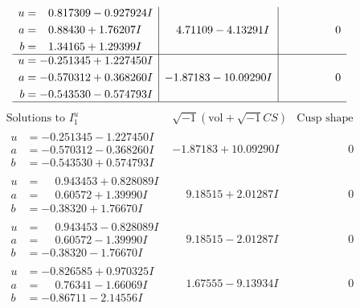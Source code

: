 \documentclass[1p]{elsarticle_modified}
\theoremstyle{definition}
\newcommand{\I}{\sqrt{-1}}
\begin{document}
$$\begin{array}{c|c|c}
\begin{aligned}
u &= \phantom{-}0.817309 - 0.927924 I \\
a &= \phantom{-}0.88430 + 1.76207 I \\
b &= \phantom{-}1.34165 + 1.29399 I\end{aligned}
 & \phantom{-}4.71109 - 4.13291 I & \phantom{-0.000000 } 0 \\ \hline\begin{aligned}
u &= -0.251345 + 1.227450 I \\
a &= -0.570312 + 0.368260 I \\
b &= -0.543530 - 0.574793 I\end{aligned}
 & -1.87183 - 10.09290 I & \phantom{-0.000000 } 0\\
 \hline 
 \end{array}$$\newpage$$\begin{array}{c|c|c}  
\text{Solutions to }I^u_{1}& \I (\text{vol} + \sqrt{-1}CS) & \text{Cusp shape}\\
 \hline 
\begin{aligned}
u &= -0.251345 - 1.227450 I \\
a &= -0.570312 - 0.368260 I \\
b &= -0.543530 + 0.574793 I\end{aligned}
 & -1.87183 + 10.09290 I & \phantom{-0.000000 } 0 \\ \hline\begin{aligned}
u &= \phantom{-}0.943453 + 0.828089 I \\
a &= \phantom{-}0.60572 + 1.39990 I \\
b &= -0.38320 + 1.76670 I\end{aligned}
 & \phantom{-}9.18515 + 2.01287 I & \phantom{-0.000000 } 0 \\ \hline\begin{aligned}
u &= \phantom{-}0.943453 - 0.828089 I \\
a &= \phantom{-}0.60572 - 1.39990 I \\
b &= -0.38320 - 1.76670 I\end{aligned}
 & \phantom{-}9.18515 - 2.01287 I & \phantom{-0.000000 } 0 \\ \hline\begin{aligned}
u &= -0.826585 + 0.970325 I \\
a &= \phantom{-}0.76341 - 1.66069 I \\
b &= -0.86711 - 2.14556 I\end{aligned}
 & \phantom{-}1.67555 - 9.13934 I & \phantom{-0.000000 } 0 \\ \hline\begin{aligned}

\end{aligned}
\end{array}$$
\end{document}
